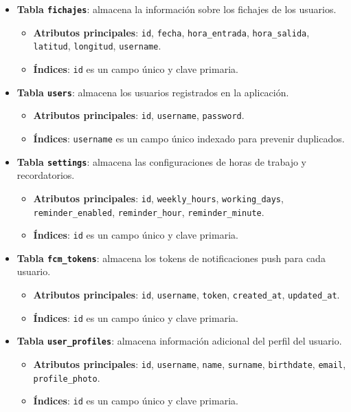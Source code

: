 \begin{itemize}
  \item \textbf{Tabla \texttt{fichajes}}: almacena la información sobre los fichajes de los usuarios.
  \begin{itemize}
    \item \textbf{Atributos principales}: \texttt{id}, \texttt{fecha}, \texttt{hora\_entrada}, \texttt{hora\_salida}, \texttt{latitud}, \texttt{longitud}, \texttt{username}.
    \item \textbf{Índices}: \texttt{id} es un campo único y clave primaria.
  \end{itemize}
  
  \item \textbf{Tabla \texttt{users}}: almacena los usuarios registrados en la aplicación.
  \begin{itemize}
    \item \textbf{Atributos principales}: \texttt{id}, \texttt{username}, \texttt{password}.
    \item \textbf{Índices}: \texttt{username} es un campo único indexado para prevenir duplicados.
  \end{itemize}
  
  \item \textbf{Tabla \texttt{settings}}: almacena las configuraciones de horas de trabajo y recordatorios.
  \begin{itemize}
    \item \textbf{Atributos principales}: \texttt{id}, \texttt{weekly\_hours}, \texttt{working\_days}, \texttt{reminder\_enabled}, \texttt{reminder\_hour}, \texttt{reminder\_minute}.
    \item \textbf{Índices}: \texttt{id} es un campo único y clave primaria.
  \end{itemize}
  
  \item \textbf{Tabla \texttt{fcm\_tokens}}: almacena los tokens de notificaciones push para cada usuario.
  \begin{itemize}
    \item \textbf{Atributos principales}: \texttt{id}, \texttt{username}, \texttt{token}, \texttt{created\_at}, \texttt{updated\_at}.
    \item \textbf{Índices}: \texttt{id} es un campo único y clave primaria.
  \end{itemize}

  \item \textbf{Tabla \texttt{user\_profiles}}: almacena información adicional del perfil del usuario.
  \begin{itemize}
    \item \textbf{Atributos principales}: \texttt{id}, \texttt{username}, \texttt{name}, \texttt{surname}, \texttt{birthdate}, \texttt{email}, \texttt{profile\_photo}.
    \item \textbf{Índices}: \texttt{id} es un campo único y clave primaria.
  \end{itemize}
\end{itemize}

